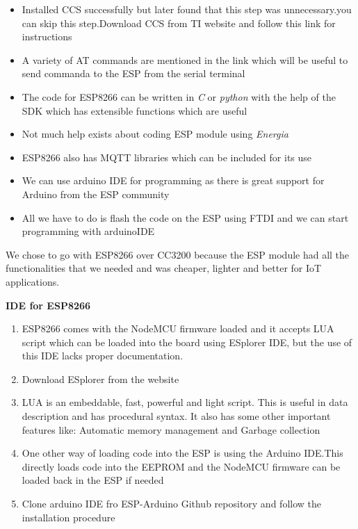 \documentclass[16pt]{article}
\begin{document}
\begin{itemize}

\item
  Installed CCS successfully but later found that this step was unnecessary.you can skip this step.Download CCS from TI website and follow this link for instructions
\item
  A variety of AT commands are mentioned in the link which will be
  useful to send commanda to the ESP from the serial terminal
\item
  The code for ESP8266 can be written in \emph{C} or \emph{python} with
  the help of the SDK which has extensible functions which are useful
\item
  Not much help exists about coding ESP module using \emph{Energia}
\item
  ESP8266 also has MQTT libraries which can be included for its use
\item
  We can use arduino IDE for programming as there is great support for
  Arduino from the ESP community
\item
  All we have to do is flash the code on the ESP using FTDI and we can
  start programming with arduinoIDE
  
\end{itemize}

We chose to go with ESP8266 over CC3200 because the ESP module had all
the functionalities that we needed and was cheaper, lighter and better
for IoT applications.

\vspace{5.5cm}

{\LARGE{\textbf{IDE for ESP8266}}}

\begin{enumerate}

\item
  ESP8266 comes with the NodeMCU firmware loaded and it accepts LUA
  script which can be loaded into the board using ESplorer IDE, but the
  use of this IDE lacks proper documentation.
\item
  Download ESplorer from the website 
\item
  LUA is an embeddable, fast, powerful and light script. This is useful in data
  description and has procedural syntax. It also has some other
  important features like: Automatic memory management and Garbage
  collection
\item
  One other way of loading code into the ESP is using the Arduino
  IDE.This directly loads code into the EEPROM and the NodeMCU firmware
  can be loaded back in the ESP if
  needed
\item Clone
  arduino IDE fro ESP-Arduino Github repository and follow
  the installation procedure
\end{enumerate}
\end{document}
